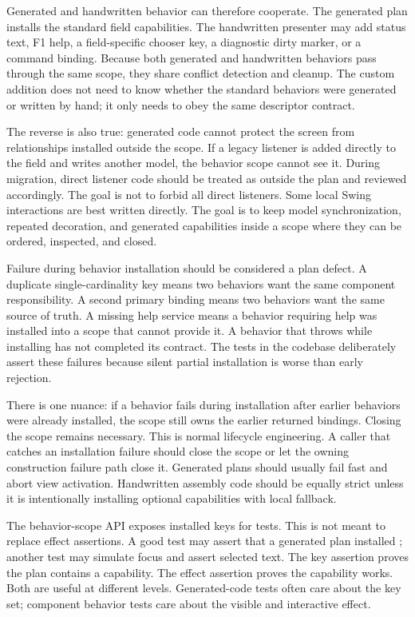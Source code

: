 Generated and handwritten behavior can therefore cooperate. The generated plan
installs the standard field capabilities. The handwritten presenter may add
status text, F1 help, a field-specific chooser key, a diagnostic dirty marker,
or a command binding. Because both generated and handwritten behaviors pass
through the same scope, they share conflict detection and cleanup. The custom
addition does not need to know whether the standard behaviors were generated or
written by hand; it only needs to obey the same descriptor contract.

The reverse is also true: generated code cannot protect the screen from
relationships installed outside the scope. If a legacy listener is added
directly to the field and writes another model, the behavior scope cannot see
it. During migration, direct listener code should be treated as outside the
plan and reviewed accordingly. The goal is not to forbid all direct listeners.
Some local Swing interactions are best written directly. The goal is to keep
model synchronization, repeated decoration, and generated capabilities inside a
scope where they can be ordered, inspected, and closed.

Failure during behavior installation should be considered a plan defect. A
duplicate single-cardinality key means two behaviors want the same component
responsibility. A second primary binding means two behaviors want the same
source of truth. A missing help service means a behavior requiring help was
installed into a scope that cannot provide it. A behavior that throws while
installing has not completed its contract. The tests in the codebase deliberately
assert these failures because silent partial installation is worse than early
rejection.

There is one nuance: if a behavior fails during installation after earlier
behaviors were already installed, the scope still owns the earlier returned
bindings. Closing the scope remains necessary. This is normal lifecycle
engineering. A caller that catches an installation failure should close the
scope or let the owning construction failure path close it. Generated plans
should usually fail fast and abort view activation. Handwritten assembly code
should be equally strict unless it is intentionally installing optional
capabilities with local fallback.

The behavior-scope API exposes installed keys for tests. This is not meant to
replace effect assertions. A good test may assert that a generated plan
installed ; another test may
simulate focus and assert selected text. The key assertion proves the plan
contains a capability. The effect assertion proves the capability works. Both
are useful at different levels. Generated-code tests often care about the key
set; component behavior tests care about the visible and interactive effect.


